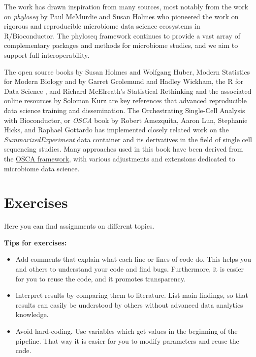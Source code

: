 \documentclass[
]{book}
\providecommand{\tightlist}{%
  \setlength{\itemsep}{0pt}\setlength{\parskip}{0pt}}
\begin{document}
The work has drawn inspiration from many sources, most notably from
the work on \emph{phyloseq} by Paul McMurdie and Susan Holmes
\citep{McMurdie2013} who pioneered the work on rigorous and reproducible
microbiome data science ecosystems in R/Bioconductor. The phyloseq
framework continues to provide a vast array of complementary packages
and methods for microbiome studies, and we aim to support full
interoperability.

The open source books by Susan Holmes and Wolfgang Huber, Modern
Statistics for Modern Biology \citep{Holmes2019} and by Garret Grolemund
and Hadley Wickham, the R for Data Science \citep{Grolemund2017}, and
Richard McElreath's Statistical Rethinking and the associated online
resources by Solomon Kurz \citep{McElreath2020} are key references that
advanced reproducible data science training and dissemination. The
Orchestrating Single-Cell Analysis with Bioconductor, or \emph{OSCA} book
by Robert Amezquita, Aaron Lun, Stephanie Hicks, and Raphael Gottardo
\citep{Amezquita2020natmeth} has implemented closely related work on the
\emph{SummarizedExperiment} data container and its derivatives in the field
of single cell sequencing studies. Many approaches used in this book
have been derived from the \href{https://bioconductor.org/books/release/OSCA/}{OSCA
framework}, with various
adjustments and extensions dedicated to microbiome data science.

\hypertarget{exercises}{%
\chapter{Exercises}\label{exercises}}

Here you can find assignments on different topics.

\textbf{Tips for exercises:}

\begin{itemize}
\tightlist
\item
  Add comments that explain what each line or lines of code do. This helps you and others to understand your code and find bugs. Furthermore, it is easier for you to reuse the code, and it promotes transparency.
\item
  Interpret results by comparing them to literature. List main findings, so that results can easily be understood by others without advanced data analytics knowledge.
\item
  Avoid hard-coding. Use variables which get values in the beginning of the pipeline. That way it is easier for you to modify parameters and reuse the code.
\end{itemize}
\end{document}
